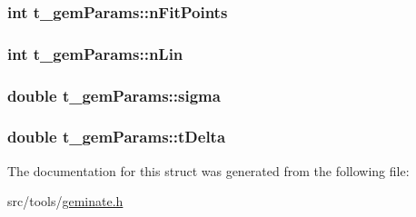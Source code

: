 \hypertarget{structt__gemParams_aa6825e32d3e5a9b72826be9dcb2715b6}{
\subsubsection[{n\-Fit\-Points}]{\setlength{\rightskip}{0pt plus 5cm}int {\bf t\-\_\-gem\-Params\-::n\-Fit\-Points}}}\label{structt__gemParams_aa6825e32d3e5a9b72826be9dcb2715b6}
\hypertarget{structt__gemParams_afd00cbecc1b94eec896fba17d9ab6243}{
\subsubsection[{n\-Lin}]{\setlength{\rightskip}{0pt plus 5cm}int {\bf t\-\_\-gem\-Params\-::n\-Lin}}}\label{structt__gemParams_afd00cbecc1b94eec896fba17d9ab6243}
\hypertarget{structt__gemParams_acf2d5c245533627f39ef9717217d0a69}{
\subsubsection[{sigma}]{\setlength{\rightskip}{0pt plus 5cm}double {\bf t\-\_\-gem\-Params\-::sigma}}}\label{structt__gemParams_acf2d5c245533627f39ef9717217d0a69}
\hypertarget{structt__gemParams_a21f188d4c27784bbeb085eb211072b3f}{
\subsubsection[{t\-Delta}]{\setlength{\rightskip}{0pt plus 5cm}double {\bf t\-\_\-gem\-Params\-::t\-Delta}}}\label{structt__gemParams_a21f188d4c27784bbeb085eb211072b3f}


\-The documentation for this struct was generated from the following file\-:\begin{DoxyCompactItemize}
\item 
src/tools/\hyperlink{geminate_8h}{geminate.\-h}\end{DoxyCompactItemize}
